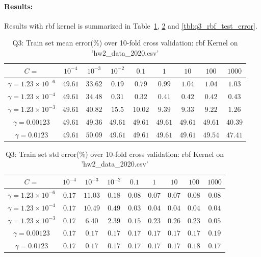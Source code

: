\paragraph{Results:}Results with rbf kernel is summarized in Table~\ref{tbl:q3_rbf_train_mean}, \ref{tbl:q3_rbf_train_std} and \ref{tbl:q3_rbf_test_error}.
\begin{table}[ht]
	\centering
	\caption{Q3: Train set mean error(\%) over 10-fold cross validation: rbf Kernel on 'hw2\_data\_2020.csv'}
	\begin{tabular}[t]{ccccccccc} 
		\hline
		$C=$ & $10^{-4}$ & $10^{-3}$ & $10^{-2}$ & $0.1$ & $1$ & $10$ & $100$ & $1000$\\ [0.5ex] 
		\hline
		$\gamma=1.23\times 10^{-6}$ & $49.61$ & $33.62$ & $0.19$ & $0.79$ & $0.99$ & $1.04$ & $1.04$ & $1.03$\\
		$\gamma=1.23\times 10^{-4}$ & $49.61$ & $34.48$ & $0.31$ & $0.32$ & $0.41$ & $0.42$ & $0.42$ & $0.43$\\
		$\gamma=1.23\times 10^{-3}$ & $49.61$ & $40.82$ & $15.5$ & $10.02$ & $9.39$ & $9.33$ & $9.22$ & $1.26$\\
		$\gamma=0.00123$ & $49.61$ & $49.36$ & $49.61$ & $49.61$ & $49.61$ & $49.61$ & $49.61$ & $40.39$\\
		$\gamma=0.0123$ & $49.61$ & $50.09$ & $49.61$ & $49.61$ & $49.61$ & $49.61$ & $49.54$ & $47.41$\\[1ex]
		\hline
	\end{tabular}
	\label{tbl:q3_rbf_train_mean}
\end{table}
\begin{table}[ht]
	\centering
	\caption{Q3: Train set std error(\%) over 10-fold cross validation: rbf Kernel on 'hw2\_data\_2020.csv'}
	\begin{tabular}[t]{ccccccccc} 
		\hline
		$C=$ 						& $10^{-4}$ & $10^{-3}$ & $10^{-2}$ & $0.1$ 	& $1$ 		& $10$ 		& $100$ 	& $1000$\\ [0.5ex] 
		\hline
		$\gamma=1.23\times 10^{-6}$ & $0.17$ 	& $11.03$ 	& $0.18$ 	& $0.08$ 	& $0.07$ 	& $0.07$ 	& $0.08$ 	& $0.08$\\
		$\gamma=1.23\times 10^{-4}$ & $0.17$ 	& $10.49$ 	& $0.49$ 	& $0.03$ 	& $0.04$ 	& $0.04$ 	& $0.04$ 	& $0.04$\\
		$\gamma=1.23\times 10^{-3}$ & $0.17$ 	& $6.40$ 	& $2.39$ 	& $0.15$ 	& $0.23$ 	& $0.26$ 	& $0.23$ 	& $0.05$\\
		$\gamma=0.00123$ 			& $0.17$ 	& $0.17$ 	& $0.17$ 	& $0.17$ 	& $0.17$ 	& $0.17$ 	& $0.17$ 	& $0.19$\\
		$\gamma=0.0123$ 			& $0.17$ 	& $0.17$ 	& $0.17$ 	& $0.17$ 	& $0.17$ 	& $0.17$ 	& $0.18$ 	& $0.17$\\[1ex]
		\hline
	\end{tabular}
	\label{tbl:q3_rbf_train_std}
\end{table}
